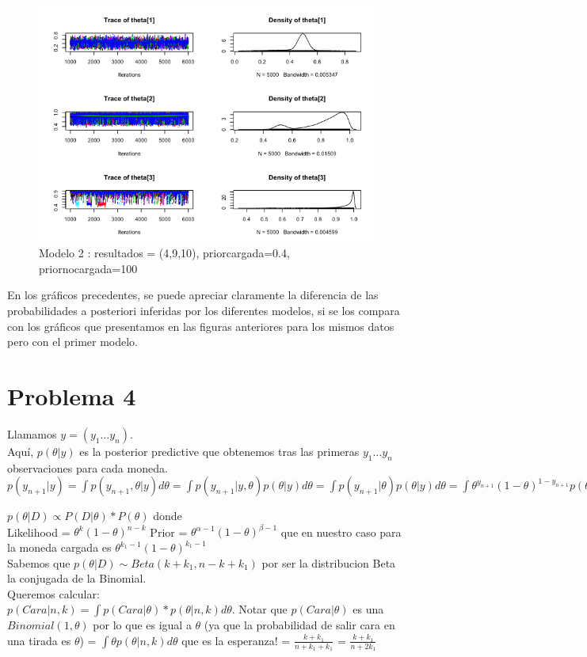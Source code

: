 \documentclass[a4paper]{article}
\begin{document}
\begin{figure}[h!]
\centering
\includegraphics[scale=0.5] {img6.png}
\caption{ Modelo 2 : resultados = (4,9,10), priorcargada=0.4, priornocargada=100 }
\end{figure}

En los gráficos precedentes, se puede apreciar claramente la diferencia de las probabilidades
a posteriori inferidas por los diferentes modelos, si se los compara con los 
gráficos que presentamos en las figuras anteriores para los mismos datos pero con el 
primer modelo.

\newpage
\section {Problema 4}
Llamamos $ y = ( y_1 \dots y_n ) $. \\

Aquí, $ p(\theta | y) $ es la posterior predictive que obtenemos tras las primeras
$ y_1 \dots y_n $ observaciones para cada moneda. \\

$ 
p(y_{n+1} | y) =  \int p(y_{n+1}, \theta | y) d\theta 
			   =  \int p(y_{n+1} | y, \theta) p(\theta | y) d \theta
			   =  \int p(y_{n+1} | \theta) p(\theta | y) d \theta
			   =  \int \theta^{y_{n+1}} (1 - \theta)^{1 - y_{n+1}} p(\theta | y) d \theta
$


$ p(\theta | D) \propto P(D | \theta) * P(\theta) $ donde \\

Likelihood = $\theta^{k}(1-\theta)^{n - k}$
Prior = $\theta^{\alpha - 1}(1-\theta)^{\beta - 1}$ que en nuestro caso para la moneda cargada es $ \theta^{k_1 - 1}(1-\theta)^{k_1 - 1} $ \\
Sabemos que $p(\theta | D) \sim Beta(k + k_1, n - k + k_1)$ por ser la distribucion Beta la conjugada de la Binomial. \\
Queremos calcular: \\
$p(Cara | n, k) 	= \int p(Cara | \theta) * p(\theta | n, k) d \theta$. Notar que $p(Cara | \theta)$ es una $Binomial(1, \theta)$ por lo que es igual a $\theta$ (ya que la probabilidad de salir cara en una tirada es $\theta$)
				= $\int \theta p(\theta | n, k) d \theta$ que es la esperanza!
				= $\frac {k + k_1}{n + k_1 + k_1}$
				= $\frac {k + k_1}{n + 2k_1}$
\newpage
\end{document}
